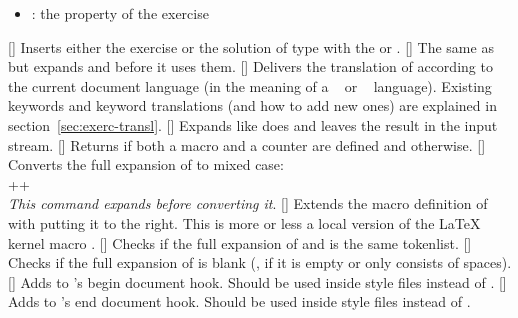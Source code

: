 \documentclass{xsim-manual}
\begin{document}
\begin{commands}
\begin{itemize}
      \item {}: the  property of the exercise
    \end{itemize}
  []
    Inserts either the exercise or the solution
    of type  with the  or  .
  []
    The same as  but expands  and  before it
    uses them.
  \expandable{}[]
    Delivers the translation of  according to the current
    document language (in the meaning of a ~\cite{pkg:babel} or
    ~\cite{pkg:polyglossia} language).  Existing keywords and
    keyword translations (and how to add new ones) are explained in
    section~\vref{sec:exerc-transl}.
  []
    Expands  like  does and leaves the result in the
    input stream.
  \expandable{}[]
    Returns  if both a macro  and a counter
     are defined and  otherwise.
  []
    Converts the full expansion of  to mixed case: \\
    \verbcode++  \\
    \emph{This command expands  before converting it}.
  []
    Extends the macro definition of  with  putting it
    to the right.  This is more or less a local version of the LaTeX kernel
    macro .
  \expandable{}[]
    Checks if the full expansion of  and  is the
    same tokenlist.
  \expandable{}[]
    Checks if the full expansion of  is blank (\ie, if it is empty
    or only consists of spaces).
  []
    Adds  to \xsim's begin document hook.
    Should be used inside style files instead of .
  []
    Adds  to \xsim's end document hook.
    Should be used inside style files instead of .
\end{commands}
\end{document}
